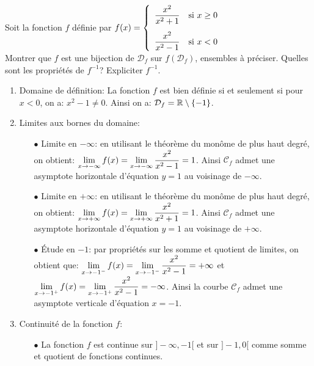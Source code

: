\documentclass[a4paper, 11pt,reqno]{article}
\begin{document}
\begin{exercice}  \;
	Soit la fonction $f$ d\'efinie par $f(x)=\left\lbrace\begin{array}{ll}
			\ddp\frac{x^2}{x^2+1} & \hbox{si}\ x\geq 0\vsec \\
			\ddp\frac{x^2}{x^2-1} & \hbox{si}\ x<0
		\end{array}
		\right.$\\
	Montrer que $f$ est une bijection de $\mathcal{D}_f$ sur $f\left(\mathcal{D}_f \right)$, ensembles \`a pr\'eciser. Quelles sont les propri\'et\'es de $f^{-1}$? Expliciter $f^{-1}$.
\end{exercice}
\begin{correction}  \;
	\begin{enumerate}
		\item Domaine de d\'efinition: La fonction $f$ est bien d\'efinie si et seulement si pour $x<0$, on a: $x^2-1\not= 0$. Ainsi on a: $\mathcal{D}_f=\mathbb{R}\setminus\lbrace -1\rbrace$.
		\item Limites aux bornes du domaine:
		      \begin{itemize}
			      \item[$\bullet$] Limite en $-\infty$: en utilisant le th\'eor\`{e}me du mon\^{o}me de plus haut degr\'e, on obtient: $\lim\limits_{x\to -\infty} f(x)=\lim\limits_{x\to -\infty} \displaystyle\frac{x^2}{x^2-1}=1$. Ainsi $\mathcal{C}_f$ admet une asymptote horizontale d'\'equation $y=1$ au voisinage de $-\infty$.
			      \item[$\bullet$] Limite en $+\infty$: en utilisant le th\'eor\`{e}me du mon\^{o}me de plus haut degr\'e, on obtient: $\lim\limits_{x\to +\infty} f(x)=\lim\limits_{x\to +\infty} \displaystyle\frac{x^2}{x^2+1}=1$. Ainsi $\mathcal{C}_f$ admet une asymptote horizontale d'\'equation $y=1$ au voisinage de $+\infty$.
			      \item[$\bullet$] \'Etude en $-1$: par propri\'et\'es sur les somme et quotient de limites, on obtient que:
			            $\lim\limits_{x\to -1^-} f(x)=\lim\limits_{x\to -1^-} \displaystyle\frac{x^2}{x^2-1}=+\infty$ et $\lim\limits_{x\to -1^+} f(x)=\lim\limits_{x\to -1^+} \displaystyle\frac{x^2}{x^2-1}=-\infty$. Ainsi la courbe $\mathcal{C}_f$ admet une asymptote verticale d'\'equation $x=-1$.
		      \end{itemize}
		\item Continuit\'e de la fonction $f$:
		      \begin{itemize}
			      \item[$\bullet$] La fonction $f$ est continue sur $\rbrack -\infty,-1\lbrack$ et sur $\rbrack -1,0\lbrack$ comme somme et quotient de fonctions continues.

\end{itemize}
\end{enumerate}
\end{correction}
\end{document}
